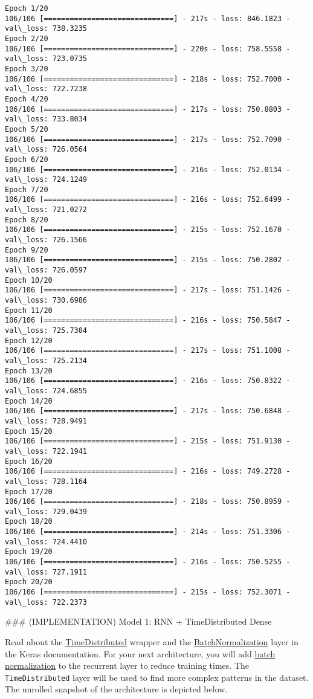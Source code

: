 \documentclass[11pt]{article}
\begin{document}
    \begin{Verbatim}[commandchars=\\\{\}]
Epoch 1/20
106/106 [==============================] - 217s - loss: 846.1823 - val\_loss: 738.3235
Epoch 2/20
106/106 [==============================] - 220s - loss: 758.5558 - val\_loss: 723.0735
Epoch 3/20
106/106 [==============================] - 218s - loss: 752.7000 - val\_loss: 722.7238
Epoch 4/20
106/106 [==============================] - 217s - loss: 750.8803 - val\_loss: 733.8034
Epoch 5/20
106/106 [==============================] - 217s - loss: 752.7090 - val\_loss: 726.0564
Epoch 6/20
106/106 [==============================] - 216s - loss: 752.0134 - val\_loss: 724.1249
Epoch 7/20
106/106 [==============================] - 216s - loss: 752.6499 - val\_loss: 721.0272
Epoch 8/20
106/106 [==============================] - 215s - loss: 752.1670 - val\_loss: 726.1566
Epoch 9/20
106/106 [==============================] - 215s - loss: 750.2802 - val\_loss: 726.0597
Epoch 10/20
106/106 [==============================] - 217s - loss: 751.1426 - val\_loss: 730.6986
Epoch 11/20
106/106 [==============================] - 216s - loss: 750.5847 - val\_loss: 725.7304
Epoch 12/20
106/106 [==============================] - 217s - loss: 751.1008 - val\_loss: 725.2134
Epoch 13/20
106/106 [==============================] - 216s - loss: 750.8322 - val\_loss: 724.6855
Epoch 14/20
106/106 [==============================] - 217s - loss: 750.6848 - val\_loss: 728.9491
Epoch 15/20
106/106 [==============================] - 215s - loss: 751.9130 - val\_loss: 722.1941
Epoch 16/20
106/106 [==============================] - 216s - loss: 749.2728 - val\_loss: 728.1164
Epoch 17/20
106/106 [==============================] - 218s - loss: 750.8959 - val\_loss: 729.0439
Epoch 18/20
106/106 [==============================] - 214s - loss: 751.3306 - val\_loss: 724.4410
Epoch 19/20
106/106 [==============================] - 216s - loss: 750.5255 - val\_loss: 727.1911
Epoch 20/20
106/106 [==============================] - 215s - loss: 752.3071 - val\_loss: 722.2373

    \end{Verbatim}

     \#\#\# (IMPLEMENTATION) Model 1: RNN + TimeDistributed Dense

Read about the \href{https://keras.io/layers/wrappers/}{TimeDistributed}
wrapper and the
\href{https://keras.io/layers/normalization/}{BatchNormalization} layer
in the Keras documentation. For your next architecture, you will add
\href{https://arxiv.org/pdf/1510.01378.pdf}{batch normalization} to the
recurrent layer to reduce training times. The \texttt{TimeDistributed}
layer will be used to find more complex patterns in the dataset. The
unrolled snapshot of the architecture is depicted below.
\end{document}
